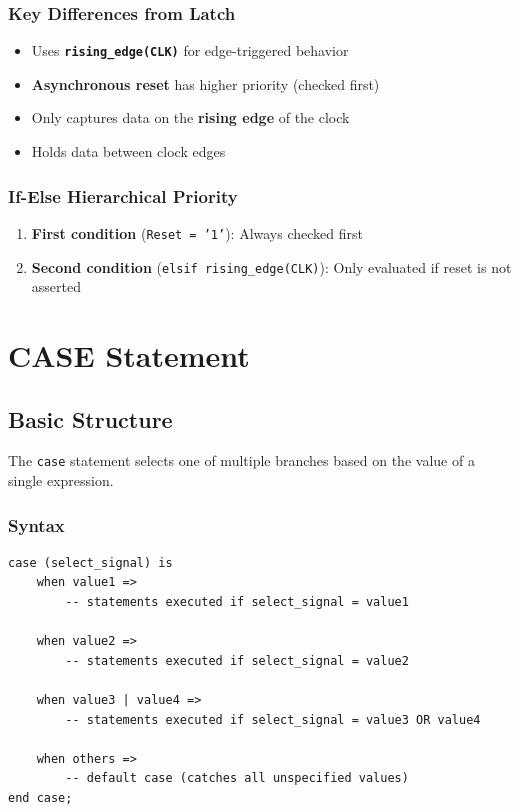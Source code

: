 \documentclass[12pt,a4paper]{article}
\begin{document}
\subsubsection{Key Differences from Latch}
\begin{itemize}
    \item Uses \textbf{\texttt{rising\_edge(CLK)}} for edge-triggered behavior
    \item \textbf{Asynchronous reset} has higher priority (checked first)
    \item Only captures data on the \textbf{rising edge} of the clock
    \item Holds data between clock edges
\end{itemize}

\subsubsection{If-Else Hierarchical Priority}
\begin{enumerate}
    \item \textbf{First condition} (\texttt{Reset = '1'}): Always checked first
    \item \textbf{Second condition} (\texttt{elsif rising\_edge(CLK)}): Only evaluated if reset is not asserted
\end{enumerate}

\newpage
\section{CASE Statement}

\subsection{Basic Structure}

The \texttt{case} statement selects one of multiple branches based on the value of a single expression.

\subsubsection{Syntax}
\begin{lstlisting}
case (select_signal) is
    when value1 =>
        -- statements executed if select_signal = value1
    
    when value2 =>
        -- statements executed if select_signal = value2
    
    when value3 | value4 =>
        -- statements executed if select_signal = value3 OR value4
    
    when others =>
        -- default case (catches all unspecified values)
end case;
\end{lstlisting}
\end{document}
